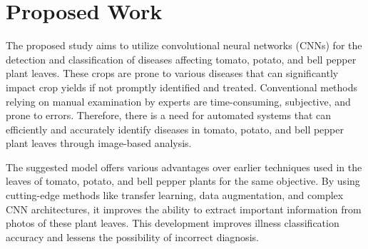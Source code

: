 \documentclass[conference]{IEEEtran}
\begin{document}









\section{Proposed Work}
The proposed study aims to utilize convolutional neural networks (CNNs) for the detection and classification of diseases affecting tomato, potato, and bell pepper plant leaves. These crops are prone to various diseases that can significantly impact crop yields if not promptly identified and treated. Conventional methods relying on manual examination by experts are time-consuming, subjective, and prone to errors. Therefore, there is a need for automated systems that can efficiently and accurately identify diseases in tomato, potato, and bell pepper plant leaves through image-based analysis.

The suggested model offers various advantages over earlier techniques used in the leaves of tomato, potato, and bell pepper plants for the same objective. By using cutting-edge methods like transfer learning, data augmentation, and complex CNN architectures, it improves the ability to extract important information from photos of these plant leaves. This development improves illness classification accuracy and lessens the possibility of incorrect diagnosis.
\end{document}
